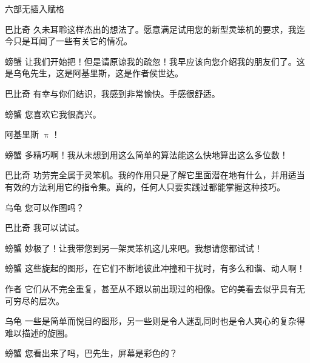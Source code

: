 \begin{dialog}{六部无插入赋格}
\begin{dialogue}
\item[巴比奇]久未耳聆这样杰出的想法了。愿意满足试用您的新型灵笨机的要求，我迄今只是耳闻了一些有关它的情况。

\item[螃蟹]让我们开始把！但是请原谅我的疏忽！我早应该向您介绍我的朋友们了。这是乌龟先生，这是阿基里斯，这是作者侯世达。

\item[巴比奇]有幸与你们结识，我感到非常愉快。手感很舒适。

\item[螃蟹]您喜欢它我很高兴。


\item[阿基里斯]$\uppi$！

\item[螃蟹]多精巧啊！我从未想到用这么简单的算法能这么快地算出这么多位数！

\item[巴比奇]功劳完全属于灵笨机。我的作用只是了解它里面潜在地有什么，并用适当有效的方法利用它的指令集。真的，任何人只要实践过都能掌握这种技巧。

\item[乌龟]您可以作图吗？

\item[巴比奇]我可以试试。

\item[螃蟹]妙极了！让我带您到另一架灵笨机这儿来吧。我想请您都试试！


\item[螃蟹]这些旋起的图形，在它们不断地彼此冲撞和干扰时，有多么和谐、动人啊！

\item[作者]它们从不完全重复，甚至从不跟以前出现过的相像。它的美看去似乎具有无可穷尽的层次。

\item[乌龟]一些是简单而悦目的图形，另一些则是令人迷乱同时也是令人爽心的复杂得难以描述的旋圈。

\item[螃蟹]您看出来了吗，巴先生，屏幕是彩色的？


\end{dialogue}
\end{dialog}
